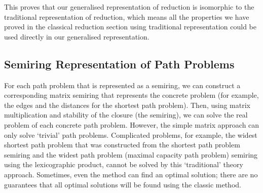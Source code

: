 \documentclass[a4paper,12pt,twoside,openright]{report}
\begin{document}
This proves that our generalised representation of reduction is isomorphic to the traditional representation of reduction, which means all the properties we have proved in the classical reduction section using traditional representation could be used directly in our generalised representation.

\subsection{Semiring Representation of Path Problems}
For each path problem that is represented as a semiring, we can construct a corresponding matrix semiring that represents the concrete problem (for example, the edges and the distances for the shortest path problem). Then, using matrix multiplication and stability of the closure (the semiring), we can solve the real problem of each concrete path problem. However, the simple matrix approach can only solve ‘trivial’ path problems. Complicated problems, for example, the widest shortest path problem that was constructed from the shortest path problem semiring and the widest path problem (maximal capacity path problem) semiring using the lexicographic product, cannot be solved by this ‘traditional’ theory approach. Sometimes, even the method can find an optimal solution; there are no guarantees that all optimal solutions will be found using the classic method.
\end{document}
